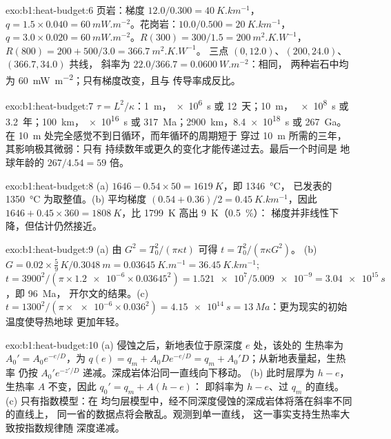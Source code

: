 \begin{solution}{exo:b1:heat-budget:6}
页岩：梯度 $12.0/0.300 = \qty{40}{K.km^{-1}}$，$q = 1.5\times0.040 =
\qty{60}{mW.m^{-2}}$。花岗岩：$10.0/0.500 = \qty{20}{K.km^{-1}}$，
$q = 3.0\times0.020 = \qty{60}{mW.m^{-2}}$。$R(300) = 300/1.5 =
\qty{200}{m^2.K.W^{-1}}$，$R(800) = 200 + 500/3.0 = \qty{366.7}{m^2.K.W^{-1}}$。
三点 $(0, 12.0)$、$(200, 24.0)$、$(366.7, 34.0)$ 共线，
斜率为 $22.0/366.7 = \qty{0.0600}{W.m^{-2}}$：相同，
两种岩石中均为 \qty{60}{mW.m^{-2}}；只有梯度改变，且与
传导率成反比。
\end{solution}

\begin{solution}{exo:b1:heat-budget:7}
$\tau = L^2/\kappa$：\qty{1}{m}，\qty{e6}{s} 或 \num{12}~天；\qty{10}{m}，
\qty{e8}{s} 或 \num{3.2}~年；\qty{100}{km}，\qty{e16}{s} 或
\qty{317}{Ma}；\qty{2900}{km}，\qty{8.4e18}{s} 或 \qty{267}{Ga}。在
\qty{10}{m} 处完全感觉不到日循环，而年循环的周期短于
穿过 \qty{10}{m} 所需的三年，其影响极其微弱：只有
持续数年或更久的变化才能传递过去。最后一个时间是
地球年龄的 $267/4.54 = 59$ 倍。
\end{solution}

\begin{solution}{exo:b1:heat-budget:8}
(a) $1646 - 0.54\times50 = \qty{1619}{K}$，即 \qty{1346}{\degreeCelsius}，
已发表的 \qty{1350}{\degreeCelsius} 为取整值。(b) 平均梯度
$(0.54 + 0.36)/2 = \qty{0.45}{K.km^{-1}}$，因此 $1646 + 0.45\times360 =
\qty{1808}{K}$，比 \qty{1799}{K} 高出 \qty{9}{K}（\qty{0.5}{\percent}）：
梯度并非线性下降，但估计仍然接近。
\end{solution}

\begin{solution}{exo:b1:heat-budget:9}
(a) 由 $G^2 = T_0^2/(\pi\kappa t)$ 可得 $t = T_0^2/(\pi\kappa G^2)$。
(b) $G = 0.02\times\tfrac59\,\unit{K}/\qty{0.3048}{m} = \qty{0.03645}{K.m^{-1}} =
\qty{36.45}{K.km^{-1}}$; $t = 3900^2/(\pi\times\num{1.2e-6}\times0.03645^2) =
\num{1.521e7}/\num{5.009e-9} = \qty{3.04e15}{s}$，即 \qty{96}{Ma}，
开尔文的结果。(c) $t = 1300^2/(\pi\times\num{e-6}\times0.036^2) =
\qty{4.15e14}{s} = \qty{13}{Ma}$：更为现实的初始温度使导热地球
更加年轻。
\end{solution}

\begin{solution}{exo:b1:heat-budget:10}
(a) 侵蚀之后，新地表位于原深度 $e$ 处，该处的
生热率为 $A_0' = A_0e^{-e/D}$，为 $q(e) = q_m +
A_0De^{-e/D} = q_m + A_0'D$；从新地表量起，生热率
仍按 $A_0'e^{-z'/D}$ 递减。深成岩体沿同一直线向下移动。
(b) 此时层厚为 $h - e$，生热率 $A$ 不变，因此 $q_0' = q_m + A(h - e)$：
即斜率为 $h - e$、过 $q_m$ 的直线。(c) 只有指数模型：在
均匀层模型中，经不同深度侵蚀的深成岩体将落在斜率不同的直线上，
同一省的数据点将会散乱。观测到单一直线，
这一事实支持生热率大致按指数规律随
深度递减。
\end{solution}

